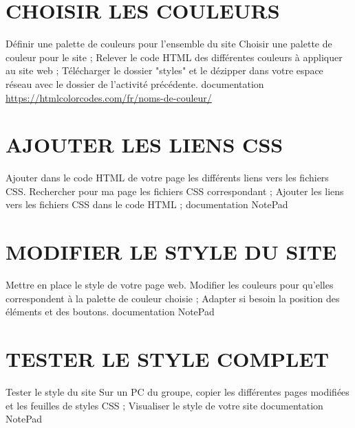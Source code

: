 \documentclass[11pt]{article}
\begin{document}
\UPSTIbuildPage



\section*{CHOISIR LES COULEURS}

\activiteressources
{Définir une palette de couleurs pour l'ensemble du site}
{
\task Choisir une palette de couleur pour le site ;
\task Relever le code HTML des différentes couleurs à appliquer au site web ;
\task Télécharger le dossier "styles" et le dézipper dans votre espace réseau avec le dossier de l'activité précédente.
}
{documentation}
{\url{https://htmlcolorcodes.com/fr/noms-de-couleur/}}


\section*{AJOUTER LES LIENS CSS}

\activiteressources
{Ajouter dans le code HTML de votre page les différents liens vers les fichiers CSS.}
{
\task Rechercher pour ma page les fichiers CSS correspondant ;
\task Ajouter les liens vers les fichiers CSS dans le code HTML ;
}
{documentation}
{NotePad}

\section*{MODIFIER LE STYLE DU SITE}

\activiteressources
{Mettre en place le style de votre page web.}
{%
\task Modifier les couleurs pour qu'elles correspondent à la palette de couleur choisie ;
\task Adapter si besoin la position des éléments et des boutons.
}
{documentation}
{NotePad}

\section*{TESTER LE STYLE COMPLET}

\activiteressources
{Tester le style du site}
{
\task Sur un PC du groupe, copier les différentes pages modifiées et les feuilles de styles CSS ;
\task Visualiser le style de votre site
}
{documentation}
{NotePad}
\end{document}
